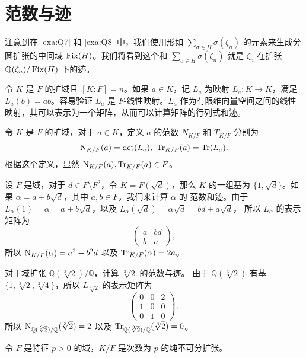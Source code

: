 \section{范数与迹}

注意到在 \autoref{exa:Q7} 和 \autoref{exa:Q8} 中，我们使用形如 $\sum_{\sigma\in H}\sigma(\zeta_n)$
的元素来生成分圆扩张的中间域 $\operatorname{Fix}(H)$。我们将看到这个和 $\sum_{\sigma\in H}\sigma(\zeta_n)$
就是 $\zeta_n$ 在扩张 $\mathbb{Q}(\zeta_n)/\operatorname{Fix}(H)$ 下的迹。

令 $K$ 是 $F$ 的扩域且 $[K:F]=n$。如果 $a\in K$，记 $L_a$ 为映射
$L_a:K\to K$，满足 $L_a(b)=ab$。容易验证 $L_a$ 是 $F$-线性映射。$L_a$
作为有限维向量空间之间的线性映射，其可以表示为一个矩阵，从而可以计算矩阵的行列式和迹。

\begin{definition}
  令 $K$ 是 $F$ 的扩域，对于 $a\in K$，定义 $a$ 的范数 $N_{K/F}$ 和 $T_{K/F}$ 分别为
  \[
    \N_{K/F}(a)=\det(L_a),\ \Tr_{K/F}(a)=\mathrm{Tr}(L_a).
  \]
  根据这个定义，显然 $\operatorname{N}_{K/F}(a),\operatorname{Tr}_{K/F}(a)\in F$。
\end{definition}

\begin{example}
  设 $F$ 是域，对于 $d\in F\setminus F^2$，令 $K=F(\sqrt{d})$，那么 $K$ 的一组基为
  $\{1,\sqrt{d}\}$。如果 $\alpha=a+b\sqrt{d}$，其中 $a,b\in F$，我们来计算 $\alpha$ 的
  范数和迹。由于 $L_\alpha(1)=\alpha=a+b\sqrt{d}$，以及 $L_\alpha(\sqrt{d})=\alpha\sqrt{d}=bd+a\sqrt{d}$，
  所以 $L_\alpha$ 的表示矩阵为
  \[
    \begin{pmatrix}
      a & bd \\
      b & a
    \end{pmatrix},
  \]
  所以 $\operatorname{N}_{K/F}(\alpha)=a^2-b^2d$ 以及 $\operatorname{Tr}_{K/F}(\alpha)=2a$。
\end{example}

\begin{example}
  对于域扩张 $\mathbb{Q}(\sqrt[3]{2})/\mathbb{Q}$，计算 $\sqrt[3]{2}$ 的范数与迹。
  由于 $\mathbb{Q}(\sqrt[3]{2})$ 有基 $\{1,\sqrt[3]{2},\sqrt[3]{4}\}$，所以
  $L_{\sqrt[3]{2}}$ 的表示矩阵为
  \[
    \begin{pmatrix}
      0 & 0 & 2 \\
      1 & 0 & 0 \\
      0 & 1 & 0
    \end{pmatrix},
  \]
  所以 $\operatorname{N}_{\mathbb{Q}(\sqrt[3]{2})/\mathbb{Q}}(\sqrt[3]{2})=2$ 以及 $\operatorname{Tr}_{\mathbb{Q}(\sqrt[3]{2})/\mathbb{Q}}(\sqrt[3]{2})=0$。
\end{example}

\begin{example}
  令 $F$ 是特征 $p>0$ 的域，$K/F$ 是次数为 $p$ 的纯不可分扩张。
\end{example}






